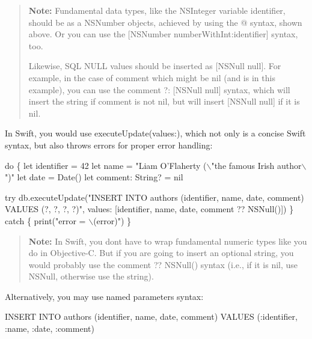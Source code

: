 \begin{quote}
{\bfseries Note\+:} Fundamental data types, like the {\ttfamily N\+S\+Integer} variable {\ttfamily identifier}, should be as a {\ttfamily N\+S\+Number} objects, achieved by using the {\ttfamily @} syntax, shown above. Or you can use the {\ttfamily \mbox{[}N\+S\+Number number\+With\+Int\+:identifier\mbox{]}} syntax, too.

Likewise, S\+QL {\ttfamily N\+U\+LL} values should be inserted as {\ttfamily \mbox{[}N\+S\+Null null\mbox{]}}. For example, in the case of {\ttfamily comment} which might be {\ttfamily nil} (and is in this example), you can use the {\ttfamily comment ?\+: \mbox{[}N\+S\+Null null\mbox{]}} syntax, which will insert the string if {\ttfamily comment} is not {\ttfamily nil}, but will insert {\ttfamily \mbox{[}N\+S\+Null null\mbox{]}} if it is {\ttfamily nil}. \end{quote}


In Swift, you would use {\ttfamily execute\+Update(values\+:)}, which not only is a concise Swift syntax, but also {\ttfamily throws} errors for proper error handling\+:


\begin{DoxyCode}
do \{
    let identifier = 42
    let name = "Liam O'Flaherty (\(\backslash\)"the famous Irish author\(\backslash\)")"
    let date = Date()
    let comment: String? = nil

    try db.executeUpdate("INSERT INTO authors (identifier, name, date, comment) VALUES (?, ?, ?, ?)",
       values: [identifier, name, date, comment ?? NSNull()])
\} catch \{
    print("error = \(\backslash\)(error)")
\}
\end{DoxyCode}


\begin{quote}
{\bfseries Note\+:} In Swift, you don\textquotesingle{}t have to wrap fundamental numeric types like you do in Objective-\/C. But if you are going to insert an optional string, you would probably use the {\ttfamily comment ?? N\+S\+Null()} syntax (i.\+e., if it is {\ttfamily nil}, use {\ttfamily N\+S\+Null}, otherwise use the string). \end{quote}


Alternatively, you may use named parameters syntax\+:


\begin{DoxyCode}
\textcolor{keyword}{INSERT} \textcolor{keyword}{INTO} authors (identifier, name, \textcolor{keywordtype}{date}, comment) \textcolor{keyword}{VALUES} (:identifier, :name, :\textcolor{keywordtype}{date}, :comment)
\end{DoxyCode}


